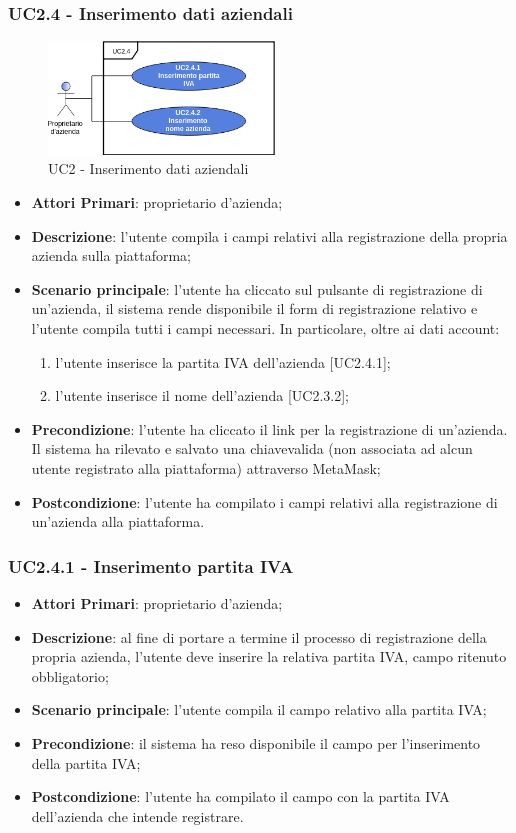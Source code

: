 \subsubsection{UC2.4 - Inserimento dati aziendali}
\begin{figure}[h]
	\includegraphics[width=6cm]{res/images/UC2-4RegistrazioneAzienda.png}
	\centering
	\caption{UC2 - Inserimento dati aziendali}
\end{figure}
\begin{itemize}
	\item \textbf{Attori Primari}: proprietario d'azienda;
	\item \textbf{Descrizione}: l'utente compila i campi relativi alla registrazione della propria azienda sulla piattaforma;
	\item \textbf{Scenario principale}: l'utente ha cliccato sul pulsante di registrazione di un'azienda, il sistema rende disponibile il form di registrazione relativo e l'utente compila tutti i campi necessari. In particolare, oltre ai dati account:
	\begin{enumerate}[label=\alph*.]
		\item l'utente inserisce la partita IVA dell'azienda [UC2.4.1];
		\item l'utente inserisce il nome dell'azienda [UC2.3.2];
	\end{enumerate}
	\item \textbf{Precondizione}: l'utente ha cliccato il link per la registrazione di un'azienda. Il sistema ha rilevato e salvato una chiave\glosp valida (non associata ad alcun utente registrato alla piattaforma) attraverso MetaMask\glo;
	\item \textbf{Postcondizione}: l'utente ha compilato i campi relativi alla registrazione di un'azienda alla piattaforma.
\end{itemize}
\subsubsection{UC2.4.1 - Inserimento partita IVA}
\begin{itemize}
	\item \textbf{Attori Primari}: proprietario d'azienda;
	\item \textbf{Descrizione}: al fine di portare a termine il processo di registrazione della propria azienda, l'utente deve inserire la relativa partita IVA, campo ritenuto obbligatorio;
	\item \textbf{Scenario principale}: l'utente compila il campo relativo alla partita IVA;
	\item \textbf{Precondizione}: il sistema ha reso disponibile il campo per l'inserimento della partita IVA;
	\item \textbf{Postcondizione}: l'utente ha compilato il campo con la partita IVA dell'azienda che intende registrare.
\end{itemize}

